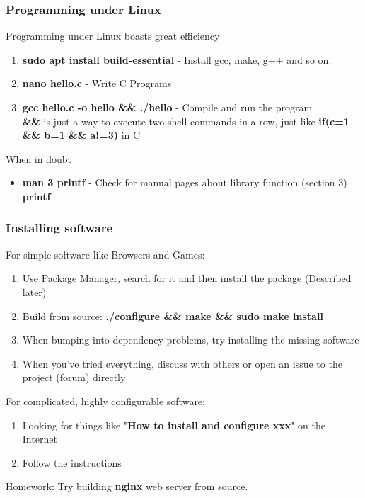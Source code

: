 \documentclass[11pt]{beamer}
\begin{document}
\begin{frame}
\frametitle{Programming under Linux}
Programming under Linux boasts great efficiency
\begin{enumerate}
\item \textbf{sudo apt install build-essential} - Install gcc, make, g++ and so on.
\item \textbf{nano hello.c} - Write C Programs
\item \textbf{gcc hello.c -o hello \&\& ./hello} - Compile and run the program\\
\textbf{\&\&} is just a way to execute two shell commands in a row, just like \textbf{if(c=1 \&\& b=1 \&\& a!=3)} in C
\end{enumerate}
When in doubt
\begin{itemize}
\item \textbf{man 3 printf} - Check for manual pages about library function (section 3) \textbf{printf}
\end{itemize}
\end{frame}

\begin{frame}
\frametitle{Installing software}
For simple software like Browsers and Games:
\begin{enumerate}
\item Use Package Manager, search for it and then install the package (Described later)
\item Build from source: \textbf{./configure \&\& make \&\& sudo make install}
\item When bumping into dependency problems, try installing the missing software
\item When you've tried everything, discuss with others or open an issue to the project (forum) directly
\end{enumerate}

For complicated, highly configurable software:
\begin{enumerate}
\item Looking for things like "\textbf{How to install and configure xxx}" on the Internet
\item Follow the instructions
\end{enumerate}

Homework: Try building \textbf{nginx} web server from source.
\end{frame}
\end{document}

